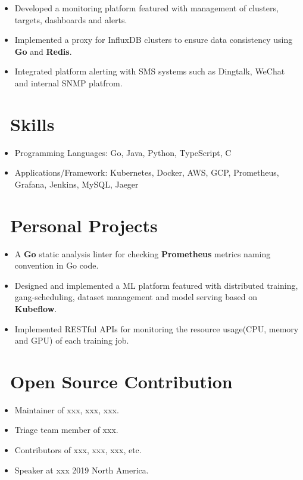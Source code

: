 \documentclass{resume}
\begin{document}
\begin{itemize}
  \item Developed a monitoring platform featured with management of clusters, targets, dashboards and alerts.
  \item Implemented a proxy for InfluxDB clusters to ensure data consistency using \textbf{Go} and \textbf{Redis}.
  \item Integrated platform alerting with SMS systems such as Dingtalk, WeChat and internal SNMP platfrom.
\end{itemize}

\section{\faKey\ Skills}
\begin{itemize}[parsep=0.5ex]
  \item Programming Languages: Go, Java, Python, TypeScript, C
  \item Applications/Framework: Kubernetes, Docker, AWS, GCP, Prometheus, Grafana, Jenkins, MySQL, Jaeger
\end{itemize}

\section{\faCogs\ Personal Projects}
\begin{itemize}
  \item A \textbf{Go} static analysis linter for checking \textbf{Prometheus} metrics naming convention in Go code.
\end{itemize}

\begin{itemize}
  \item Designed and implemented a ML platform featured with distributed training, gang-scheduling, dataset management and model serving based on \textbf{Kubeflow}.
  \item Implemented RESTful APIs for monitoring the resource usage(CPU, memory and GPU) of each training job.
\end{itemize}

\section{\faInfo\ Open Source Contribution}
\begin{itemize}[parsep=0.5ex]
  \item Maintainer of xxx, xxx, xxx.
  \item Triage team member of xxx.
  \item Contributors of xxx, xxx, xxx, etc.
  \item Speaker at xxx 2019 North America.
\end{itemize}
\end{document}
